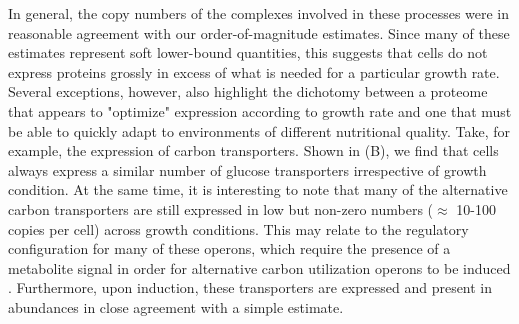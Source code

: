 In general, the copy numbers of the complexes involved in these processes were
in reasonable agreement with our order-of-magnitude estimates. Since many of these
estimates represent soft lower-bound quantities, this suggests that cells do not
express proteins grossly in excess of what is needed for a particular growth
rate. Several exceptions, however, also highlight the dichotomy between a
proteome that appears to "optimize" expression according to growth rate and one
that must be able to quickly adapt to environments of different nutritional
quality. Take, for example, the expression of carbon transporters. Shown in
(B), we find that cells always express a similar number of
glucose transporters irrespective of growth condition. At the same time, it is
interesting to note that many of the alternative carbon transporters are still
expressed in low but non-zero numbers ($\approx$ 10-100 copies per cell) across
growth conditions. This may relate to the regulatory configuration for many of
these operons, which require the presence of a metabolite signal in order for
alternative carbon utilization operons to be induced \citep{monod1949,
laxhuber2020}. Furthermore, upon induction, these transporters are expressed and
present in abundances in close agreement with a simple estimate.


